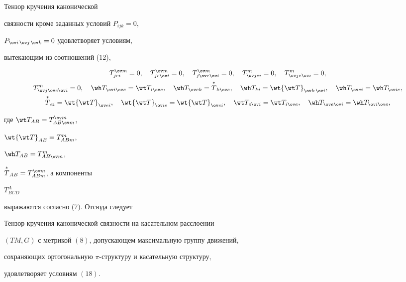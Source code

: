 Тензор кручения канонической


связности кроме заданных условий $P_{ijk}=0$,


$P_{\ov i\,\ov j\,\ov k}=0$ удовлетворяет условиям,


вытекающим из соотношений (12),


\begin{gather}


T^{\ov m}_{jei}=0, \quad T^{\ov m}_{je\ov i}=0,\quad


T^{\ov m}_{j\ov e\ov i}=0,\quad T^m_{\ov j ei}=0,\quad


T^m_{\ov j e\ov i}=0, \notag\\


%


T^m_{\ov j\ov e\ov i}=0,\quad \wh T_{\ov i\ov e}=


\wt T_{i\ov e},\quad \wh T_{\ov e k}=\up{*}{T}_{k\ov e},\quad


\wh T_{ki}=\wt{\wt T}_{\ov k\,\ov i},\quad


\wh T_{\ov e i}=\wh T_{\ov i e}, \\


%


\up{*}{T}_{ei}=\wt{\wt T}_{\ov e i},\quad


\wt{\wt T}_{\ov i e}=\wt{\wt T}_{\ov e i},\quad


\wt T_{e\ov i}=\wt T_{i\ov e},\quad


\wh T_{\ov e\ov i}=\wh T_{\ov i\ov e},\notag


\end{gather}


где $\wt T_{AB}=T^{\ov m}_{AB\ov m}$,


$\wt{\wt T}_{AB}=T^m_{ABm}$,


$\wh T_{AB}=T^m_{AB\ov m}$,


$\up{*}{T}_{AB}=T^{\ov m}_{ABm}$, а компоненты


$T^A_{BCD}$


выражаются согласно (7). Отсюда следует





\begin{thm}


Тензор кручения канонической связности на касательном расслоении


$(TM,G)$ с метрикой $(8)$, допускающем максимальную группу движений,


сохраняющих ортогональную $\pi$-структуру и касательную структуру,


удовлетворяет условиям $(18)$.


\end{thm}





